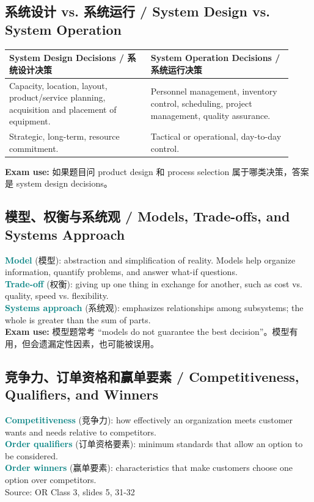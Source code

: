 \documentclass[10pt,a4paper]{ctexart}
\newcommand{\term}[2]{\textbf{\textcolor{Teal}{#1}} \textcolor{Muted}{(#2)}}
\newcommand{\source}[1]{\textcolor{Muted}{\footnotesize Source: #1}}
\newcommand{\exam}[1]{\textcolor{Amber}{\textbf{Exam use:} #1}}
\begin{document}
\subsection{系统设计 vs. 系统运行 / System Design vs. System Operation}

\begin{longtable}{@{}L{0.46\linewidth}L{0.46\linewidth}@{}}
\toprule
\textbf{System Design Decisions / 系统设计决策} & \textbf{System Operation Decisions / 系统运行决策} \\
\midrule
Capacity, location, layout, product/service planning, acquisition and placement of equipment. & Personnel management, inventory control, scheduling, project management, quality assurance. \\
Strategic, long-term, resource commitment. & Tactical or operational, day-to-day control. \\
\bottomrule
\end{longtable}

\exam{如果题目问 product design 和 process selection 属于哪类决策，答案是 system design decisions。}

\subsection{模型、权衡与系统观 / Models, Trade-offs, and Systems Approach}
\term{Model}{模型}: abstraction and simplification of reality. Models help organize information, quantify problems, and answer what-if questions.\\
\term{Trade-off}{权衡}: giving up one thing in exchange for another, such as cost vs. quality, speed vs. flexibility.\\
\term{Systems approach}{系统观}: emphasizes relationships among subsystems; the whole is greater than the sum of parts.\\
\exam{模型题常考 ``models do not guarantee the best decision''。模型有用，但会遗漏定性因素，也可能被误用。}

\subsection{竞争力、订单资格和赢单要素 / Competitiveness, Qualifiers, and Winners}

\term{Competitiveness}{竞争力}: how effectively an organization meets customer wants and needs relative to competitors.\\
\term{Order qualifiers}{订单资格要素}: minimum standards that allow an option to be considered.\\
\term{Order winners}{赢单要素}: characteristics that make customers choose one option over competitors.\\
\source{OR Class 3, slides 5, 31-32}
\end{document}
